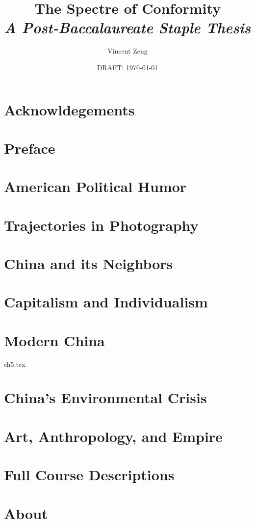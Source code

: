 \documentclass{book}[10pt]
\title{\Huge{The Spectre of Conformity\\
\huge{\textit{A Post-Baccalaureate Staple Thesis}}}}
\author{Vincent Zeng}
\date{DRAFT: \today}
\begin{document}
\maketitle


\frontmatter
\chapter{Acknowldegements}


\tableofcontents

\blankpage
\blankpage

\chapter{Preface}


\blankpage
\blankpage

\mainmatter

\chapter{American Political Humor}


\chapter{Trajectories in Photography}


\chapter{China and its Neighbors}


\chapter{Capitalism and Individualism}


\chapter{Modern China}
 {ch5.tex}

\chapter{China's Environmental Crisis}


\chapter{Art, Anthropology, and Empire}


\appendix

\chapter{Full Course Descriptions}


\blankpage
\blankpage
\blankpage
\chapter*{About}

\end{document}
